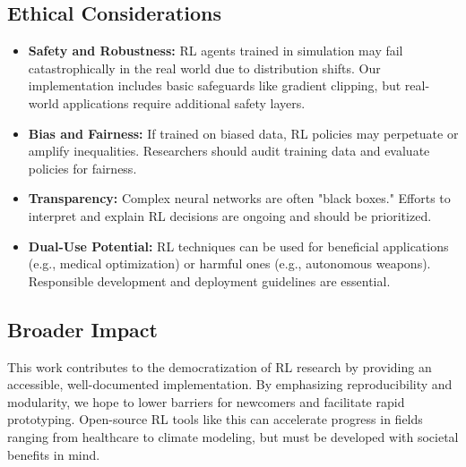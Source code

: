 \documentclass[11pt]{article}
\begin{document}
\subsection{Ethical Considerations}
\begin{itemize}
  \item \textbf{Safety and Robustness:} RL agents trained in simulation may fail catastrophically in the real world due to distribution shifts. Our implementation includes basic safeguards like gradient clipping, but real-world applications require additional safety layers.
  \item \textbf{Bias and Fairness:} If trained on biased data, RL policies may perpetuate or amplify inequalities. Researchers should audit training data and evaluate policies for fairness.
  \item \textbf{Transparency:} Complex neural networks are often "black boxes." Efforts to interpret and explain RL decisions are ongoing and should be prioritized.
  \item \textbf{Dual-Use Potential:} RL techniques can be used for beneficial applications (e.g., medical optimization) or harmful ones (e.g., autonomous weapons). Responsible development and deployment guidelines are essential.
\end{itemize}

\subsection{Broader Impact}
This work contributes to the democratization of RL research by providing an accessible, well-documented implementation. By emphasizing reproducibility and modularity, we hope to lower barriers for newcomers and facilitate rapid prototyping. Open-source RL tools like this can accelerate progress in fields ranging from healthcare to climate modeling, but must be developed with societal benefits in mind.
\end{document}
